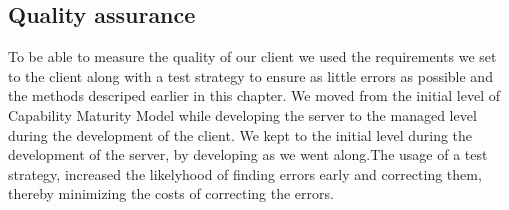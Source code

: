 \subsection{Quality assurance}
To be able to measure the quality of our client we used the requirements we set to the client along with a test strategy to ensure as little errors as possible and the methods descriped earlier in this chapter. We moved from the initial level of Capability Maturity Model while developing the server to the managed level during the development of the client. We kept to the initial level during the development of the server, by developing as we went along.The usage of a test strategy, increased the likelyhood of finding errors early and correcting them, thereby minimizing the costs of correcting the errors.

 